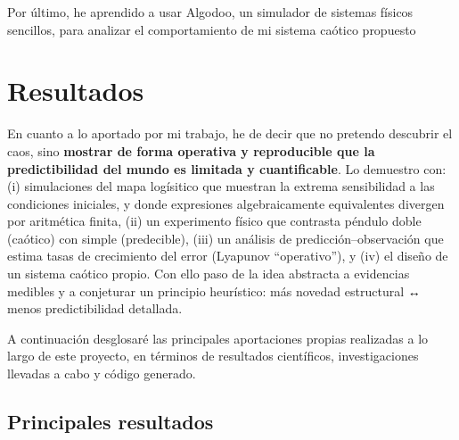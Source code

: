 \documentclass[
  10pt,
  a4paper,
  DIV=11,
  numbers=noendperiod,
  open=any]{scrreprt}
\numberwithin{equation}{chapter}
\numberwithin{equation}{section}
\renewcommand{\[}{\begin{equation}}
\renewcommand{\]}{\end{equation}}
\begin{document}
Por último, he aprendido a usar Algodoo, un simulador de sistemas
físicos sencillos, para analizar el comportamiento de mi sistema caótico
propuesto

\chapter{Resultados}\label{resultados}

En cuanto a lo aportado por mi trabajo, he de decir que no pretendo
descubrir el caos, sino \textbf{mostrar de forma operativa y
reproducible que la predictibilidad del mundo es limitada y
cuantificable}. Lo demuestro con: (i) simulaciones del mapa logísitico
que muestran la extrema sensibilidad a las condiciones iniciales, y
donde expresiones algebraicamente equivalentes divergen por aritmética
finita, (ii) un experimento físico que contrasta péndulo doble (caótico)
con simple (predecible), (iii) un análisis de predicción--observación
que estima tasas de crecimiento del error (Lyapunov ``operativo''), y
(iv) el diseño de un sistema caótico propio. Con ello paso de la idea
abstracta a evidencias medibles y a conjeturar un principio heurístico:
más novedad estructural ↔ menos predictibilidad detallada.

A continuación desglosaré las principales aportaciones propias
realizadas a lo largo de este proyecto, en términos de resultados
científicos, investigaciones llevadas a cabo y código generado.

\section{Principales resultados}\label{principales-resultados}
\end{document}

